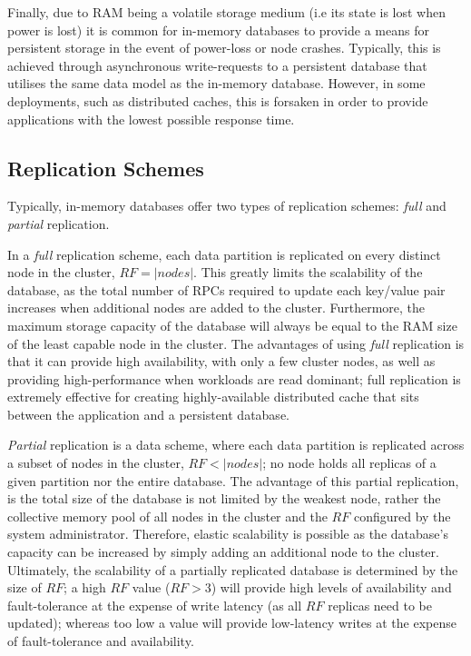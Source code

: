 Finally, due to RAM being a volatile storage medium (i.e its state is lost when power is lost) it is common for in-memory databases to provide a means for persistent storage in the event of power-loss or node crashes.  Typically, this is achieved through asynchronous write-requests to a persistent database that utilises the same data model as the in-memory database.  However, in some deployments, such as distributed caches, this is forsaken in order to provide applications with the lowest possible response time.  
    
    \subsection{Replication Schemes}\label{replication_schemes}
	Typically, in-memory databases offer two types of replication schemes: \emph{full} and \emph{partial} replication.  
	
	In a \emph{full} replication scheme, each data partition is replicated on every distinct node in the cluster, $RF = \left\vert nodes \right\vert$.  This greatly limits the scalability of the database, as the total number of RPCs required to update each key/value pair increases when additional nodes are added to the cluster.  Furthermore, the maximum storage capacity of the database will always be equal to the RAM size of the least capable node in the cluster.  The advantages of using \emph{full} replication is that it can provide high availability, with only a few cluster nodes, as well as providing high-performance when workloads are read dominant; full replication is extremely effective for creating highly-available distributed cache that sits between the application and a persistent database.  
	
	\emph{Partial} replication is a data scheme, where each data partition is replicated across a subset of nodes in the cluster, $RF < \left\vert nodes \right\vert$; no node holds all replicas of a given partition nor the entire database.  The advantage of this partial replication, is the total size of the database is not limited by the weakest node, rather the collective memory pool of all nodes in the cluster and the $RF$ configured by the system administrator.  Therefore, elastic scalability is possible as the database's capacity can be increased by simply adding an additional node to the cluster.  Ultimately, the scalability of a partially replicated database is determined by the size of $RF$; a high $RF$ value ($RF > 3$) will provide high levels of availability and fault-tolerance at the expense of write latency (as all $RF$ replicas need to be updated); whereas too low a value will provide low-latency writes at the expense of fault-tolerance and availability.   
	
